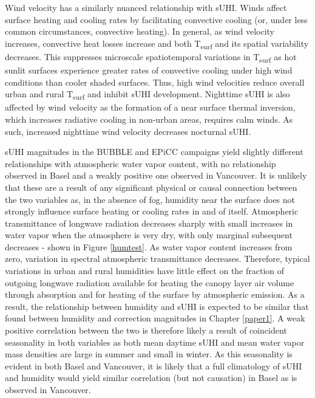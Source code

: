 \begin{bibunit}
Wind velocity has a similarly nuanced relationship with sUHI. Winds affect surface heating and cooling rates by facilitating convective cooling (or, under less common circumstances, convective heating). In general, as wind velocity increases, convective heat losses increase and both T\textsubscript{surf} and its spatial variability decreases. This suppresses microscale spatiotemporal variations in T\textsubscript{surf} as hot sunlit surfaces experience greater rates of convective cooling under high wind conditions than cooler shaded surfaces. Thus, high wind velocities reduce overall urban and rural T\textsubscript{surf} and inhibit sUHI development. Nighttime sUHI is also affected by wind velocity as the formation of a near surface thermal inversion, which increases radiative cooling in non-urban areas, requires calm winds. As such, increased nighttime wind velocity decreases nocturnal sUHI.

sUHI magnitudes in the BUBBLE and EPiCC campaigns yield slightly different relationships with atmospheric water vapor content, with no relationship observed in Basel and a weakly positive one observed in Vancouver. It is unlikely that these are a result of any significant physical or causal connection between the two variables as, in the absence of fog, humidity near the surface does not strongly influence surface heating or cooling rates in and of itself. Atmospheric transmittance of longwave radiation decreases sharply with small increases in water vapor when the atmosphere is very dry, with only marginal subsequent decreases - shown in Figure \ref{humtest}. As water vapor content increases from zero, variation in spectral atmospheric transmittance decreases. Therefore, typical variations in urban and rural humidities have little effect on the fraction of outgoing longwave radiation available for heating the canopy layer air volume through absorption and for heating of the surface by atmospheric emission. As a result, the relationship between humidity and sUHI is expected to be similar that found between humidity and correction magnitudes in Chapter \ref{paper1}. A weak positive correlation between the two is therefore likely a result of coincident seasonality in both variables as both mean daytime sUHI and mean water vapor mass densities are large in summer and small in winter. As this seasonality is evident in both Basel and Vancouver, it is likely that a full climatology of sUHI and humidity would yield similar correlation (but not causation) in Basel as is observed in Vancouver. 


\end{bibunit}
